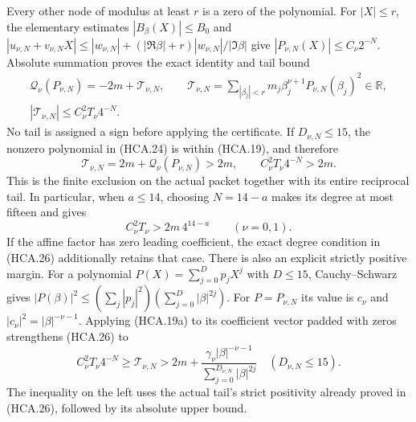 Every other node of modulus at least $r$ is a zero of the
polynomial. For $|X|\leq r$, the elementary estimates
$|B_\beta(X)|\leq B_0$ and
$|u_{\nu,N}+v_{\nu,N}X|\leq|w_{\nu,N}|+
(|\Re\beta|+r)|w_{\nu,N}|/|\Im\beta|$ give
$|P_{\nu,N}(X)|\leq C_\nu2^{-N}$. Absolute summation proves
the exact identity and tail bound
\[
 \begin{gathered}
 \mathcal Q_\nu(P_{\nu,N})=-2m+\mathcal T_{\nu,N},\qquad
 \mathcal T_{\nu,N}=\sum_{|\beta_j|<r}
                  m_j\beta_j^{\nu+1}P_{\nu,N}(\beta_j)^2\in\mathbb R,\\
 |\mathcal T_{\nu,N}|\leq C_\nu^2T_\nu4^{-N}.
 \end{gathered}
 \tag{HCA.25}
\]
No tail is assigned a sign before applying the certificate.
If $D_{\nu,N}\leq15$, the nonzero polynomial in (HCA.24) is
within (HCA.19), and therefore
\[
 \boxed{\mathcal T_{\nu,N}=2m+\mathcal Q_\nu(P_{\nu,N})>2m,
 \qquad C_\nu^2T_\nu4^{-N}>2m.}
 \tag{HCA.26}
\]
This is the finite exclusion on the actual packet together with its
entire reciprocal tail. In particular, when $a\leq14$, choosing
$N=14-a$ makes its degree at most fifteen and gives
\[
 C_\nu^2T_\nu>2m\,4^{14-a}\qquad(\nu=0,1).
 \tag{HCA.27}
\]
If the affine factor has zero leading coefficient, the exact
degree condition in (HCA.26) additionally retains that case.
There is also an explicit strictly positive margin. For a polynomial
$P(X)=\sum_{j=0}^D p_jX^j$ with $D\leq15$,
Cauchy--Schwarz gives
$|P(\beta)|^2\leq(\sum_j|p_j|^2)(\sum_{j=0}^D|\beta|^{2j})$.
For $P=P_{\nu,N}$ its value is $c_\nu$ and
$|c_\nu|^2=|\beta|^{-\nu-1}$. Applying (HCA.19a) to its
coefficient vector padded with zeros strengthens (HCA.26) to
\[
 \boxed{C_\nu^2T_\nu4^{-N}\geq\mathcal T_{\nu,N}
 >2m+\frac{\gamma_\nu|\beta|^{-\nu-1}}
               {\sum_{j=0}^{D_{\nu,N}}|\beta|^{2j}}
 \quad(D_{\nu,N}\leq15).}
 \tag{HCA.27a}
\]
The inequality on the left uses the actual tail's strict positivity
already proved in (HCA.26), followed by its absolute upper bound.

